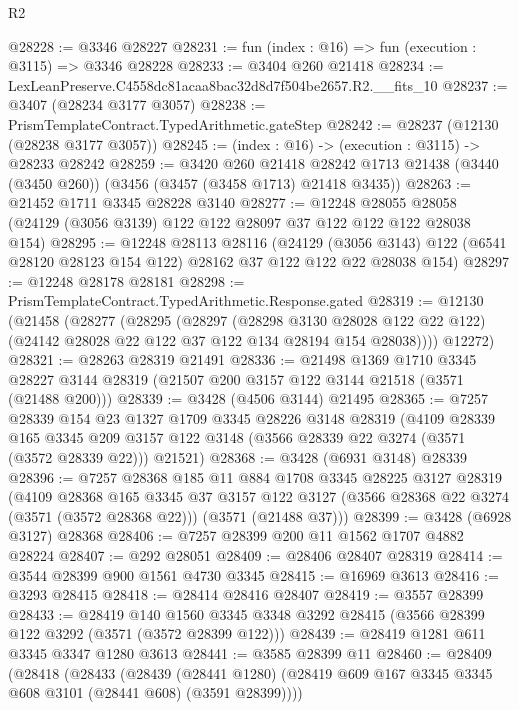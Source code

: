 \begin{lexlean}{R2}
\begin{coremodule}
@28228 := @3346 @28227
@28231 := fun (index : @16) => fun (execution : @3115) => @3346 @28228
@28233 := @3404 @260 @21418
@28234 := LexLeanPreserve.C4558dc81acaa8bac32d8d7f504be2657.R2.__fits_10
@28237 := @3407 (@28234 @3177 @3057)
@28238 := PrismTemplateContract.TypedArithmetic.gateStep
@28242 := @28237 (@12130 (@28238 @3177 @3057))
@28245 := (index : @16) -> (execution : @3115) -> @28233 @28242
@28259 := @3420
    @260
    @21418
    @28242
    @1713
    @21438
    (@3440 (@3450 @260))
    (@3456 (@3457 (@3458 @1713) @21418 @3435))
@28263 := @21452 @1711 @3345 @28228 @3140
@28277 := @12248
    @28055
    @28058
    (@24129 (@3056 @3139) @122 @122 @28097 @37 @122 @122 @122 @28038 @154)
@28295 := @12248
    @28113
    @28116
    (@24129 (@3056 @3143) @122 (@6541 @28120 @28123 @154 @122) @28162 @37 @122 @122 @22 @28038 @154)
@28297 := @12248 @28178 @28181
@28298 := PrismTemplateContract.TypedArithmetic.Response.gated
@28319 := @12130
    (@21458
      (@28277
        (@28295
          (@28297
            (@28298 @3130 @28028 @122 @22 @122)
            (@24142 @28028 @22 @122 @37 @122 @134 @28194 @154 @28038))))
      @12272)
@28321 := @28263 @28319 @21491
@28336 := @21498
    @1369
    @1710
    @3345
    @28227
    @3144
    @28319
    (@21507 @200 @3157 @122 @3144 @21518 (@3571 (@21488 @200)))
@28339 := @3428 (@4506 @3144) @21495
@28365 := @7257
    @28339
    @154
    @23
    @1327
    @1709
    @3345
    @28226
    @3148
    @28319
    (@4109
      @28339
      @165
      @3345
      @209
      @3157
      @122
      @3148
      (@3566 @28339 @22 @3274 (@3571 (@3572 @28339 @22)))
      @21521)
@28368 := @3428 (@6931 @3148) @28339
@28396 := @7257
    @28368
    @185
    @11
    @884
    @1708
    @3345
    @28225
    @3127
    @28319
    (@4109
      @28368
      @165
      @3345
      @37
      @3157
      @122
      @3127
      (@3566 @28368 @22 @3274 (@3571 (@3572 @28368 @22)))
      (@3571 (@21488 @37)))
@28399 := @3428 (@6928 @3127) @28368
@28406 := @7257 @28399 @200 @11 @1562 @1707 @4882 @28224
@28407 := @292 @28051
@28409 := @28406 @28407 @28319
@28414 := @3544 @28399 @900 @1561 @4730 @3345
@28415 := @16969 @3613
@28416 := @3293 @28415
@28418 := @28414 @28416 @28407
@28419 := @3557 @28399
@28433 := @28419
    @140
    @1560
    @3345
    @3348
    @3292
    @28415
    (@3566 @28399 @122 @3292 (@3571 (@3572 @28399 @122)))
@28439 := @28419 @1281 @611 @3345 @3347 @1280 @3613
@28441 := @3585 @28399 @11
@28460 := @28409
    (@28418
      (@28433
        (@28439
          (@28441 @1280)
          (@28419 @609 @167 @3345 @3345 @608 @3101 (@28441 @608) (@3591 @28399))))

\end{coremodule}
\end{lexlean}
